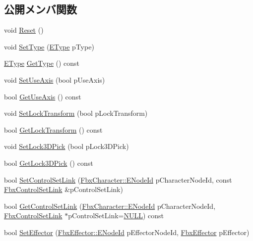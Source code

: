\subsection*{公開メンバ関数}
\begin{DoxyCompactItemize}
\item 
void \hyperlink{class_fbx_control_set_a8e9d668f72300481a7a66bf5e7142200}{Reset} ()
\item 
void \hyperlink{class_fbx_control_set_af7ff1a9f91a0f71629713281f5f1c9fc}{Set\+Type} (\hyperlink{class_fbx_control_set_a13a51702c46fff33d50c05d20f3d9f04}{E\+Type} p\+Type)
\item 
\hyperlink{class_fbx_control_set_a13a51702c46fff33d50c05d20f3d9f04}{E\+Type} \hyperlink{class_fbx_control_set_abbd6f5ed53232644c148dd662f23ef8b}{Get\+Type} () const
\item 
void \hyperlink{class_fbx_control_set_add4e86e05666ef3fb9f83ae3bbc707c0}{Set\+Use\+Axis} (bool p\+Use\+Axis)
\item 
bool \hyperlink{class_fbx_control_set_a34b3a19fbef7931ea1ee8454063bbd2b}{Get\+Use\+Axis} () const
\item 
void \hyperlink{class_fbx_control_set_aa5b0038dec7dd582522a07de65ab7229}{Set\+Lock\+Transform} (bool p\+Lock\+Transform)
\item 
bool \hyperlink{class_fbx_control_set_abdf5c1365c3d92536acb96710b8b51d6}{Get\+Lock\+Transform} () const
\item 
void \hyperlink{class_fbx_control_set_a54846bfcf364f3b14065c5ed74cd951e}{Set\+Lock3\+D\+Pick} (bool p\+Lock3\+D\+Pick)
\item 
bool \hyperlink{class_fbx_control_set_a27d80c87c41e04e1b54475fb3106c738}{Get\+Lock3\+D\+Pick} () const
\item 
bool \hyperlink{class_fbx_control_set_a448f77a06237db1189da806fb6d841f1}{Set\+Control\+Set\+Link} (\hyperlink{class_fbx_character_ad75bf42026e435ac0ff4d7ece2317be4}{Fbx\+Character\+::\+E\+Node\+Id} p\+Character\+Node\+Id, const \hyperlink{class_fbx_control_set_link}{Fbx\+Control\+Set\+Link} \&p\+Control\+Set\+Link)
\item 
bool \hyperlink{class_fbx_control_set_aec762ddd33c928ef92493332ad5adcc8}{Get\+Control\+Set\+Link} (\hyperlink{class_fbx_character_ad75bf42026e435ac0ff4d7ece2317be4}{Fbx\+Character\+::\+E\+Node\+Id} p\+Character\+Node\+Id, \hyperlink{class_fbx_control_set_link}{Fbx\+Control\+Set\+Link} $\ast$p\+Control\+Set\+Link=\hyperlink{fbxarch_8h_a070d2ce7b6bb7e5c05602aa8c308d0c4}{N\+U\+LL}) const
\item 
bool \hyperlink{class_fbx_control_set_aa274b9d69d66d7d00d7769683e275922}{Set\+Effector} (\hyperlink{class_fbx_effector_a26afd81fd3d41431311004c16536e739}{Fbx\+Effector\+::\+E\+Node\+Id} p\+Effector\+Node\+Id, \hyperlink{class_fbx_effector}{Fbx\+Effector} p\+Effector)

\end{DoxyCompactItemize}
